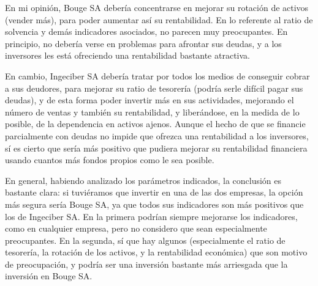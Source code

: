 \documentclass[a4paper]{article}
\begin{document}
En mi opinión, Bouge SA debería concentrarse en mejorar su rotación de activos (vender más), para poder aumentar así su rentabilidad. En lo referente al ratio de solvencia y demás indicadores asociados, no parecen muy preocupantes. En principio, no debería verse en problemas para afrontar sus deudas, y a los inversores les está ofreciendo una rentabilidad bastante atractiva.

En cambio, Ingeciber SA debería tratar por todos los medios de conseguir cobrar a sus deudores, para mejorar su ratio de tesorería (podría serle difícil pagar sus deudas), y de esta forma poder invertir más en sus actividades, mejorando el número de ventas y también su rentabilidad, y liberándose, en la medida de lo posible, de la dependencia en activos ajenos. Aunque el hecho de que se financie parcialmente con deudas no impide que ofrezca una rentabilidad a los inversores, sí es cierto que sería más positivo que pudiera mejorar su rentabilidad financiera usando cuantos más fondos propios como le sea posible.

En general, habiendo analizado los parámetros indicados, la conclusión es bastante clara: si tuviéramos que invertir en una de las dos empresas, la opción más segura sería Bouge SA, ya que todos sus indicadores son más positivos que los de Ingeciber SA. En la primera podrían siempre mejorarse los indicadores, como en cualquier empresa, pero no considero que sean especialmente preocupantes. En la segunda, sí que hay algunos (especialmente el ratio de tesorería, la rotación de los activos, y la rentabilidad económica) que son motivo de preocupación, y podría ser una inversión bastante más arriesgada que la inversión en Bouge SA.
\end{document}
